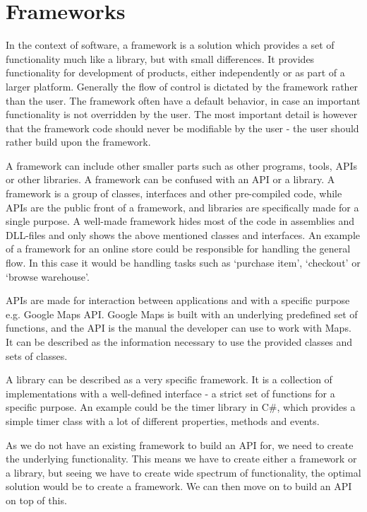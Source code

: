 \section{Frameworks}

In the context of software, a framework is a solution which provides a set of functionality much like a library, but with small differences. It provides functionality for development of products, either independently or as part of a larger platform.
Generally the flow of control is dictated by the framework rather than the user. The framework often have a default behavior, in case an important functionality is not overridden by the user. The most important detail is however that the framework code should never be modifiable by the user - the user should rather build upon the framework. \cite{framework}

A framework can include other smaller parts such as other programs, tools, APIs or other libraries. A framework can be confused with an API or a library. A framework is a group of classes, interfaces and other pre-compiled code, while APIs are the public front of a framework, and libraries are specifically made for a single purpose. A well-made framework hides most of the code in assemblies and DLL-files and only shows the above mentioned classes and interfaces. An example of a framework for an online store could be responsible for handling the general flow. In this case it would be handling tasks such as `purchase item', `checkout' or `browse warehouse'.

APIs are made for interaction between applications and with a specific purpose e.g. Google Maps API\cite{google-maps-api}. Google Maps is built with an underlying predefined set of functions, and the API is the manual the developer can use to work with Maps. It can be described as the information necessary to use the provided classes and sets of classes.

A library can be described as a very specific framework. It is a collection of implementations with a well-defined interface - a strict set of functions for a specific purpose. An example could be the timer library in C\#\cite{net-timer}, which provides a simple timer class with a lot of different properties, methods and events.

As we do not have an existing framework to build an API for, we need to create the underlying functionality. This means we have to create either a framework or a library, but seeing we have to create wide spectrum of functionality, the optimal solution would be to create a framework. We can then move on to build an API on top of this.